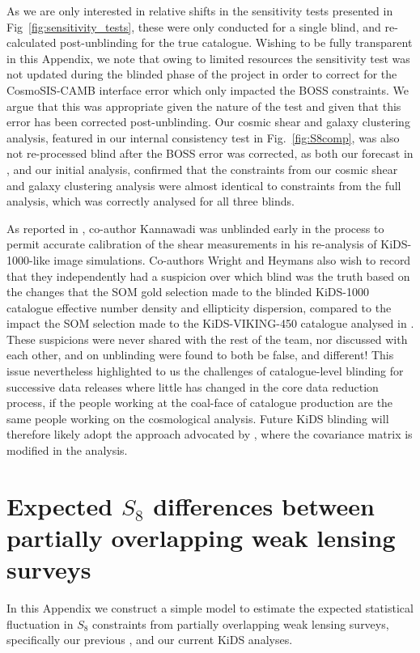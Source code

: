 \begin{appendix}
As we are only interested in relative shifts in the sensitivity tests presented in Fig~\ref{fig:sensitivity_tests}, these were only conducted for a single blind, and re-calculated post-unblinding for the true catalogue.  Wishing to be fully transparent in this Appendix, we note that owing to limited resources the sensitivity test was not updated during the blinded phase of the project in order to correct for the {\sc CosmoSIS-CAMB} interface error which only impacted the BOSS constraints.   We argue that this was appropriate given the nature of the test and given that this error has been corrected post-unblinding.    Our cosmic shear and galaxy clustering analysis, featured in our internal consistency test in Fig.~\ref{fig:S8comp}, was also not re-processed blind after the BOSS error was corrected, as both our forecast in \citet{joachimi/etal:inprep}, and our initial analysis, confirmed that the constraints from our cosmic shear and galaxy clustering analysis were almost identical to constraints from the full \tttp analysis, which was correctly analysed for all three blinds.

As reported in \citet{giblin/etal:inprep}, co-author Kannawadi was unblinded early in the process to permit accurate calibration of the shear measurements in his re-analysis of KiDS-1000-like image simulations.   Co-authors Wright and Heymans also wish to record that they independently had a suspicion over which blind was the truth based on the changes that the SOM gold selection made to the blinded KiDS-1000 catalogue effective number density and ellipticity dispersion, compared to the impact the SOM selection made to the KiDS-VIKING-450 catalogue analysed in \citet{wright/etal:2020b}.  These suspicions were never shared with the rest of the team, nor discussed with each other, and on unblinding were found to both be false, and different!   This issue nevertheless highlighted to us the challenges of catalogue-level blinding for successive data releases where little has changed in the core data reduction process, if the people working at the coal-face of catalogue production are the same people working on the cosmological analysis.   Future KiDS blinding will therefore likely adopt the approach advocated by \citet{sellentin:2020}, where the covariance matrix is modified in the analysis.

\section{Expected $S_8$ differences between partially overlapping weak lensing surveys}
\label{app:expectedoffsets}
In this Appendix we construct a simple model to estimate the expected statistical fluctuation in $S_8$ constraints from partially overlapping weak lensing surveys, specifically our previous \citep[KV450,][]{wright/etal:2020b}, and our current KiDS analyses.


\end{appendix}
